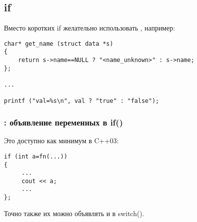 ﻿\subsection{if}

Вместо коротких if желательно использовать , например:

\begin{lstlisting}
char* get_name (struct data *s)
{
	return s->name==NULL ? "<name_unknown>" : s->name;
};

...

printf ("val=%s\n", val ? "true" : "false");
\end{lstlisting}

\subsubsection{\CPP: объявление переменных в if()}

Это доступно как минимум в C++03:

\begin{lstlisting}
if (int a=fn(...))
{
     ...
     cout << a;
     ...
};
\end{lstlisting}

Точно также их можно объявлять и в switch().

